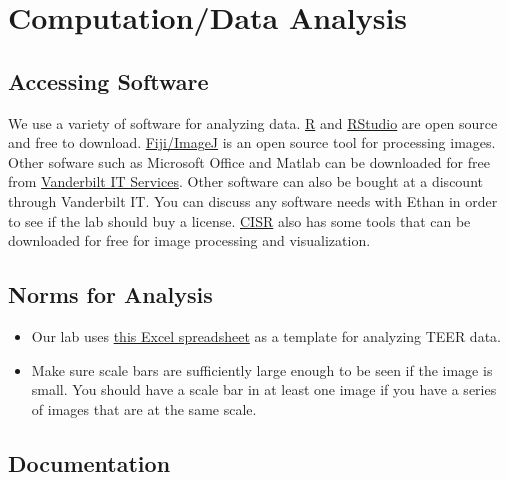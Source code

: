 \documentclass[
]{book}
\begin{document}
\hypertarget{computationdata-analysis}{%
\section{Computation/Data Analysis}\label{computationdata-analysis}}

\hypertarget{accessing-software}{%
\subsection{Accessing Software}\label{accessing-software}}

We use a variety of software for analyzing data. \href{https://www.r-project.org/}{R} and \href{https://rstudio.com/products/rstudio/download/}{RStudio} are open source and free to download. \href{https://imagej.net/Fiji}{Fiji/ImageJ} is an open source tool for processing images. Other sofware such as Microsoft Office and Matlab can be downloaded for free from \href{https://it.vanderbilt.edu/software-store/}{Vanderbilt IT Services}. Other software can also be bought at a discount through Vanderbilt IT. You can discuss any software needs with Ethan in order to see if the lab should buy a license. \href{https://my.vanderbilt.edu/cisr/microscopy-resources/downloads/}{CISR} also has some tools that can be downloaded for free for image processing and visualization.

\hypertarget{norms-for-analysis}{%
\subsection{Norms for Analysis}\label{norms-for-analysis}}

\begin{itemize}
\item
  Our lab uses \href{https://drive.google.com/file/d/1eRxUonvqSrtfm6mePRuh6x_J_fUgkLIo/view?usp=sharing}{this Excel spreadsheet} as a template for analyzing TEER data.
\item
  Make sure scale bars are sufficiently large enough to be seen if the image is small. You should have a scale bar in at least one image if you have a series of images that are at the same scale.
\end{itemize}

\hypertarget{documentation}{%
\subsection{Documentation}\label{documentation}}
\end{document}
